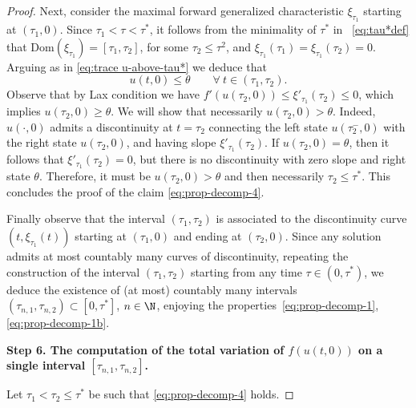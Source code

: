 \documentclass[a4paper, 10pt, final]{article}
\begin{document}
\begin{proof}
  
  Next, consider the maximal forward generalized characteristic $\xi_{{\tau}_1}$ starting at $({\tau}_1,0)$. 
  Since ${\tau}_1<\tau<\tau^*$, it follows from the minimality of $\tau^*$ in ~\eqref{eq:tau*def} that 
  $\text{Dom}(\xi_{{\tau}_1})=[{\tau}_1, {\tau}_2]$, for some ${\tau}_2\leq \tau^2$, and $\xi_{{\tau}_1}({\tau}_1)=\xi_{{\tau}_1}({\tau}_2)=0$. Arguing as in \eqref{eq:trace u-above-tau*} we deduce that 
  \[ %
      u(t,0)\leq\theta
      \qquad\forall~t\in 
      ({\tau}_1,{\tau}_2).
  \]
  Observe that by Lax condition we have $f'(u({\tau}_2,0))\leq \xi'_{{\tau}_1}({\tau}_2)\leq 0$,
  which implies $u({\tau}_2,0)\geq\theta$.
  We will show that necessarily $u(\tau_2, 0)>\theta$. 
  Indeed,  $u(\cdot, 0)$ admits a discontinuity at $t={\tau}_2$ connecting the left state $u({\tau}_2^-, 0)$ with the right state $u({\tau}_2, 0)$, and having slope $\xi'_{{\tau}_1}({\tau}_2)$.
  If $u({\tau}_2,0)=\theta$, then it follows that $\xi'_{{\tau}_1}({\tau}_2)=0$,
  but there is no discontinuity with zero slope and right state $\theta$. Therefore, it must be
    $ u({\tau}_2,0)>\theta$ and then necessarily $\tau_2\leq\tau^*$. 
    This concludes the proof of the claim \eqref{eq:prop-decomp-4}. 

  
  Finally observe that the interval $(\tau_1, \tau_2)$   is associated to 
  the discontinuity curve $(t,\xi_{{\tau}_1}(t))$ starting at $({\tau}_1, 0)$ and ending at 
  $({\tau}_2, 0)$.
  Since any solution admits at most countably many curves of discontinuity, repeating the 
  construction of the interval $({\tau}_1, {\tau}_2)$
  starting from any time
  $\tau\in (0,\tau^*)$, we deduce the existence
  of (at most) countably many intervals 
  $(\tau_{n,1},\tau_{n,2})\subset [0,\tau^*]$,
  $n\in\N$,
  enjoying the properties~\eqref{eq:prop-decomp-1}, \eqref{eq:prop-decomp-1b}.
  \smallskip

  \noindent
  {\bf Step 6. The computation of the total variation of $f(u(t,0))$ on a single interval $[\tau_{n,1}, \tau_{n,2}]$.} 

  Let $\tau_1<\tau_2\leq\tau^*$ be such that
  \eqref{eq:prop-decomp-4} holds. 


\end{proof}
\end{document}
